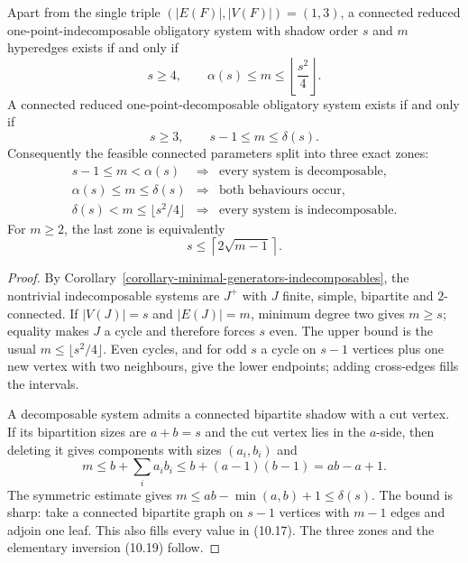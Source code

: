 \begin{theorem}
\label{theorem-indecomposability-phase-diagram}
Apart from the single triple $(|E(F)|,|V(F)|)=(1,3)$, a connected reduced
one-point-indecomposable obligatory system with shadow order $s$ and $m$
hyperedges exists if and only if
\[
s\ge4,
\qquad
\alpha(s)\le m\le\left\lfloor\frac{s^2}{4}\right\rfloor.
\tag{10.16}
\]
A connected reduced one-point-decomposable obligatory system exists if and
only if
\[
s\ge3,
\qquad
s-1\le m\le\delta(s).
\tag{10.17}
\]
Consequently the feasible connected parameters split into three exact zones:
\[
\begin{array}{rcl}
s-1\le m<\alpha(s)
 &\Longrightarrow& \text{every system is decomposable},\\
\alpha(s)\le m\le\delta(s)
 &\Longrightarrow& \text{both behaviours occur},\\
\delta(s)<m\le\lfloor s^2/4\rfloor
 &\Longrightarrow& \text{every system is indecomposable}.
\end{array}
\tag{10.18}
\]
For $m\ge2$, the last zone is equivalently
\[
s\le\left\lceil2\sqrt{m-1}\right\rceil.
\tag{10.19}
\]
\end{theorem}
\begin{proof}
By Corollary~\ref{corollary-minimal-generators-indecomposables}, the nontrivial
indecomposable systems are $J^+$ with $J$ finite, simple, bipartite and
$2$-connected.  If $|V(J)|=s$ and $|E(J)|=m$, minimum degree two gives
$m\ge s$; equality makes $J$ a cycle and therefore forces $s$ even.  The
upper bound is the usual $m\le\lfloor s^2/4\rfloor$.  Even cycles, and for odd
$s$ a cycle on $s-1$ vertices plus one new vertex with two neighbours, give
the lower endpoints; adding cross-edges fills the intervals.

A decomposable system admits a connected bipartite shadow with a cut vertex.
If its bipartition sizes are $a+b=s$ and the cut vertex lies in the $a$-side,
then deleting it gives components with sizes $(a_i,b_i)$ and
\[
m\le b+\sum_i a_i b_i
 \le b+(a-1)(b-1)=ab-a+1.
\]
The symmetric estimate gives $m\le ab-\min(a,b)+1\le\delta(s)$.  The bound is
sharp: take a connected bipartite graph on $s-1$ vertices with $m-1$ edges and
adjoin one leaf.  This also fills every value in (10.17).  The three zones and
the elementary inversion (10.19) follow.
\end{proof}

